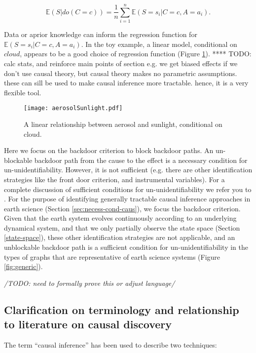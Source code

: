 \documentclass[12pt]{article}
\begin{document}
\begin{equation}
  \mathbb{E}(S | do(C = c))  = \frac{1}{n} \sum_{i=1}^n \mathbb{E}(S=s_i |
  C=c, A=a_i).
  \label{eq:6}
\end{equation}

Data or aprior knowledge can inform the regression function for $\mathbb{E}(S=s_i |
C=c, A=a_i)$. In the toy example, a linear model, conditional on
$cloud$, appears to be a good choice of regression function (Figure
\ref{fig:linear}). ****  TODO: calc stats, and reinforce main points of
section e.g. we get biased effects if we don't use causal theory, but
causal theory makes no parametric assumptions. these can sill be used
to make causal inference more tractable. hence, it is a very flexible
tool.

\begin{figure}
  \texttt{[image: aerosolSunlight.pdf]}
  \caption{A linear relationship between aerosol and sunlight,
    conditional on cloud.}
  \label{fig:linear}
\end{figure}

Here we focus on the backdoor criterion to block backdoor paths. An
un-blockable backdoor path from the cause to the effect is a necessary
condition for un-unidentifiability. However, it is not sufficient
(e.g. there are other identification strategies like the front door
criterion, and instrumental variables). For a complete discussion of
sufficient conditions for un-unidentifiability we refer you to
\citet{shpitser2006}. For the purpose of identifying generally
tractable causal inference approaches in earth science (Section
\ref{sec:necess-cond-caus}), we focus the backdoor criterion. Given
that the earth system evolves continuously according to an underlying
dynamical system, and that we only partially observe the state space
(Section \ref{state-space}), these other identification strategies are
not applicable, and an unblockable backdoor path is a sufficient
condition for un-unidentifiability in the types of graphs that are
representative of earth science systems (Figure \ref{fig:generic}).

\textit{/TODO: need to formally prove this or adjust language/}

\subsection{Clarification on terminology and relationship to literature on causal discovery}
\label{sec:discovery}
The term ``causal inference'' has been used to describe two
techniques:
\end{document}
